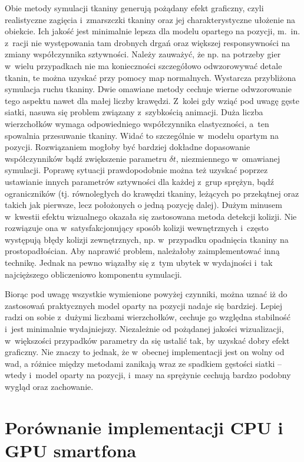 	Obie metody symulacji tkaniny generują pożądany efekt graficzny, czyli realistyczne zagięcia i~zmarszczki tkaniny oraz jej charakterystyczne ułożenie na obiekcie. Ich jakość jest minimalnie lepsza dla modelu opartego na pozycji, m.~in. z~racji nie występowania tam drobnych drgań oraz większej responsywności na zmiany współczynnika sztywności. Należy zauważyć, że np. na potrzeby gier w~wielu przypadkach nie ma konieczności szczegółowo odwzorowywać detale tkanin, te można uzyskać przy pomocy map normalnych. Wystarcza przybliżona symulacja ruchu tkaniny. Dwie omawiane metody cechuje wierne odwzorowanie tego aspektu nawet dla małej liczby krawędzi. Z~kolei gdy wziąć pod uwagę gęste siatki, nasuwa się problem związany z~szybkością animacji. Duża liczba wierzchołków wymaga odpowiedniego współczynnika elastyczności, a~ten spowalnia przesuwanie tkaniny. Widać to szczególnie w~modelu opartym na pozycji. Rozwiązaniem mogłoby być bardziej dokładne dopasowanie współczynników bądź zwiększenie parametru \( \delta t \), niezmiennego w~omawianej symulacji. Poprawę sytuacji prawdopodobnie można też uzyskać poprzez ustawianie innych parametrów sztywności dla każdej z~grup sprężyn, bądź ograniczników (tj. równoległych do krawędzi tkaniny, leżących po przekątnej oraz takich jak pierwsze, lecz położonych o jedną pozycję dalej). Dużym minusem w~kwestii efektu wizualnego okazała się zastosowana metoda detekcji kolizji. Nie rozwiązuje ona w~satysfakcjonujący sposób kolizji wewnętrznych i~często występują błędy kolizji zewnętrznych, np. w~przypadku opadnięcia tkaniny na prostopadłościan. Aby naprawić problem, należałoby zaimplementować inną technikę. Jednak na pewno wiązałby się z~tym ubytek w wydajności i~tak najcięższego obliczeniowo komponentu symulacji.
	
	Biorąc pod uwagę wszystkie wymienione powyżej czynniki, można uznać iż do zastosowań praktycznych model oparty na pozycji nadaje się bardziej. Lepiej radzi on sobie z~dużymi liczbami wierzchołków, cechuje go względna stabilność i~jest minimalnie wydajniejszy. Niezależnie od pożądanej jakości wizualizacji, w~większości przypadków parametry da się ustalić tak, by uzyskać dobry efekt graficzny. Nie znaczy to jednak, że w~obecnej implementacji jest on wolny od wad, a różnice między metodami zanikają wraz ze spadkiem gęstości siatki -- wtedy i~model oparty na pozycji, i~masy na sprężynie cechują bardzo podobny wygląd oraz zachowanie.
	
	\section{Porównanie implementacji CPU i GPU smartfona}
	\label{t:wnioski:cpu_vs_gpu}
	
